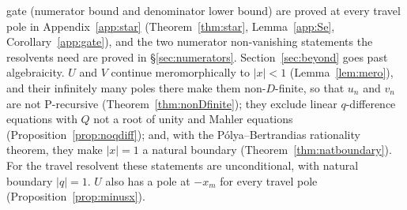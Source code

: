 \documentclass[11pt]{article}
\theoremstyle{plain}
\theoremstyle{definition}
\theoremstyle{remark}
\begin{document}
gate (numerator bound and denominator lower bound) are proved at every travel pole in
Appendix~\ref{app:star} (Theorem~\ref{thm:star}, Lemma~\ref{app:Se},
Corollary~\ref{app:gate}), and the two numerator non-vanishing statements the resolvents need are
proved in \S\ref{sec:numerators}.
Section~\ref{sec:beyond} goes past algebraicity. $U$ and $V$ continue meromorphically to $|x|<1$
(Lemma~\ref{lem:mero}), and their infinitely many poles there make them non-$D$-finite, so that
$u_n$ and $v_n$ are not P-recursive (Theorem~\ref{thm:nonDfinite}); they exclude linear
$q$-difference equations with $Q$ not a root of unity and Mahler equations
(Proposition~\ref{prop:noqdiff}); and, with the P\'olya--Bertrandias rationality theorem, they make
$|x|=1$ a natural boundary (Theorem~\ref{thm:natboundary}). For the travel resolvent these
statements are unconditional, with natural boundary $|q|=1$. $U$ also has a pole at $-x_m$ for
every travel pole (Proposition~\ref{prop:minusx}).
\end{document}
